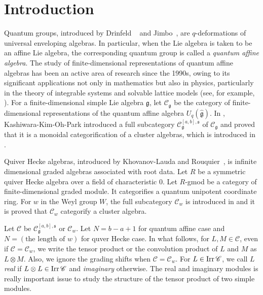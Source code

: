\section{Introduction}\label{sec : intro}
Quantum groups, introduced by Drinfeld ~\cite{Dr85} and Jimbo~\cite{Ji85}, 
are $q$-deformations of universal enveloping algebras. 
In particular, when the Lie algebra is taken to be an affine Lie algebra, 
the corresponding quantum group is called a \emph{quantum affine algebra}. 
The study of finite-dimensional representations of quantum affine algebras 
has been an active area of research since the 1990s, 
owing to its significant applications not only in mathematics but also in physics, 
particularly in the theory of integrable systems and solvable lattice models
(see, for example, \cite{Baxter, FR92, DFJMN}). 
For a finite-dimensional simple Lie algebra $\mathfrak{g}$, 
let $\mathscr{C}_{\mathfrak{g}}$ be the category of finite-dimensional representations of 
the quantum affine algebra $U_q(\hat{\mathfrak{g}})$. 
In \cite{KKOP24}, Kashiwara-Kim-Oh-Park introduced a full subcategory 
$\mathscr{C}_{\mathfrak{g}}^{[a, b], \mathfrak{s}}$ 
of $\mathscr{C}_{\mathfrak{g}}$ and proved that it is a monoidal categorification of a cluster algebras, 
which is introduced in \cite{HL10}. 

Quiver Hecke algebras, introduced by Khovanov-Lauda and Rouquier~\cite{KL09, Ro08}, 
is infinite dimensional graded algebras associated with root data. 
Let $R$ be a symmetric quiver Hecke algebra over a field of characteristic $0$. 
Let $R$-gmod be a category of finite-dimensional graded module. 
It categorifies a quantum unipotent coordinate ring. 
For $w$ in the Weyl group $W$, 
the full subcategory $\mathscr{C}_{w}$ is introduced in \cite{KKKO18} and 
it is proved that $\mathscr{C}_{w}$ categorify a cluster algebra. 

Let $\mathscr{C}$ be $\mathscr{C}_{\mathfrak{g}}^{[a, b], \mathfrak{s}}$ or $\mathscr{C}_{w}$. 
Let $N = b-a+1$ for quantum affine case and $N = (\text{the length of }w)$ for quver Hecke case. 
In what follows, for $L, M \in \mathscr{C}$, even if $\mathscr{C} = \mathscr{C}_w$, 
we write the tensor product or the convolution product of  $L$ and $M$ as $L\otimes M$. 
Also, we ignore the grading shifts when $\mathscr{C} = \mathscr{C}_w$. 
For $L \in \mathop{\mathrm{Irr}}\nolimits{\mathscr{C}}$, we call $L$ \emph{real} if $L\otimes L \in \mathop{\mathrm{Irr}}\nolimits{\mathscr{C}}$ and 
\emph{imaginary} otherwise. 
The real and imaginary modules is really important issue to study the structure of 
the tensor product of two simple modules. 

